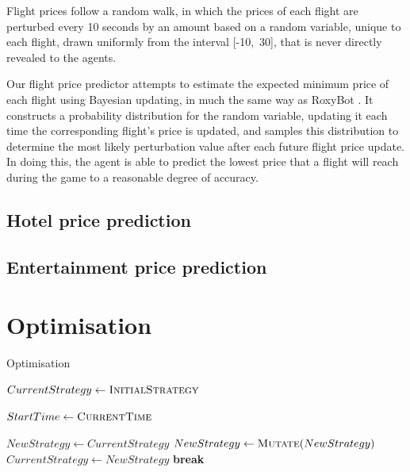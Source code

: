 \documentclass[a4paper]{proc}
\newcommand{\Break}{\State \textbf{break}}
\begin{document}
Flight prices follow a random walk, in which the prices of each flight are perturbed every 10 seconds by an amount based on a random variable, unique to each flight, drawn uniformly from the interval \mbox{[-10, 30]}, that is never directly revealed to the agents.

Our flight price predictor attempts to estimate the expected minimum price of each flight using Bayesian updating, in much the same way as Roxy\-Bot \cite{RoxyBot}. It constructs a probability distribution for the random variable, updating it each time the corresponding flight's price is updated, and samples this distribution to determine the most likely perturbation value after each future flight price update. In doing this, the agent is able to predict the lowest price that a flight will reach during the game to a reasonable degree of accuracy.

\subsection{Hotel price prediction}

\subsection{Entertainment price prediction}

\section{Optimisation}

\begin{algorithm}
  \caption{Optimisation}
  \label{alg:optimisation}
  \begin{algorithmic}
    \small
    \State $CurrentStrategy \gets \Call{InitialStrategy}{}$

      \State $StartTime \gets \Call{CurrentTime}{}$

        \State $NewStrategy \gets CurrentStrategy$
          \State $NewStrategy \gets \Call{Mutate}{NewStrategy}$
            \State $CurrentStrategy \gets NewStrategy$
            \Break
          \EndIf
        \EndFor
      \EndWhile
      \State {}
    \EndFunction
  \end{algorithmic}
\end{algorithm}
\end{document}
